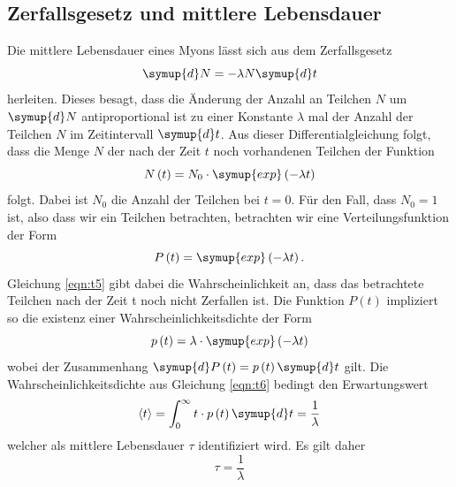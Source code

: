 \subsection{Zerfallsgesetz und mittlere Lebensdauer}
Die mittlere Lebensdauer eines Myons lässt sich aus dem Zerfallsgesetz 
\begin{equation}
    \label{eqn:t3}
    \symup{d}N = - \lambda N \symup{d}t
\end{equation}
herleiten. Dieses besagt, dass die Änderung der Anzahl an Teilchen $N$ um $\symup{d}N$ antiproportional ist zu einer Konstante $\lambda$ mal der Anzahl der Teilchen $N$ im Zeitintervall $\symup{d}t$. Aus dieser Differentialgleichung folgt, dass die Menge $N$ der nach der Zeit $t$ noch vorhandenen Teilchen der Funktion
\begin{equation}
    \label{eqn:t4}
    N\left(t\right) = N_0 \cdot \symup{exp} \left( -\lambda t \right)
\end{equation}
folgt. Dabei ist $N_0$ die Anzahl der Teilchen bei $t = 0$. Für den Fall, dass $N_0 = 1$ ist, also dass wir ein Teilchen betrachten, betrachten wir eine Verteilungsfunktion der Form 
\begin{equation}
    \label{eqn:t5}
    P\left(t\right) = \symup{exp} \left( -\lambda t \right) .
\end{equation}
Gleichung \ref{eqn:t5} gibt dabei die Wahrscheinlichkeit an, dass das betrachtete Teilchen nach der Zeit t noch nicht Zerfallen ist. Die Funktion $P\left(t\right)$ impliziert so die existenz einer Wahrscheinlichkeitsdichte der Form
\begin{equation}
    \label{eqn:t6}
    p\left(t\right) = \lambda \cdot \symup{exp} \left( -\lambda t \right) 
\end{equation}
wobei der Zusammenhang $\symup{d}P\left(t\right) = p \left(t\right) \symup{d}t$ gilt.
Die Wahrscheinlichkeitsdichte aus Gleichung \ref{eqn:t6} bedingt den Erwartungswert
\begin{equation}
    \label{eqn:t7}
    \langle t \rangle  = \int_0^{\infty} t \cdot p\left(t\right) \symup{d}t = \frac{1}{\lambda}
\end{equation}
welcher als mittlere Lebensdauer $\tau$ identifiziert wird. Es gilt daher 
\begin{equation}
    \label{eqn:t8}
    \tau = \frac{1}{\lambda}
\end{equation}
\newpage

